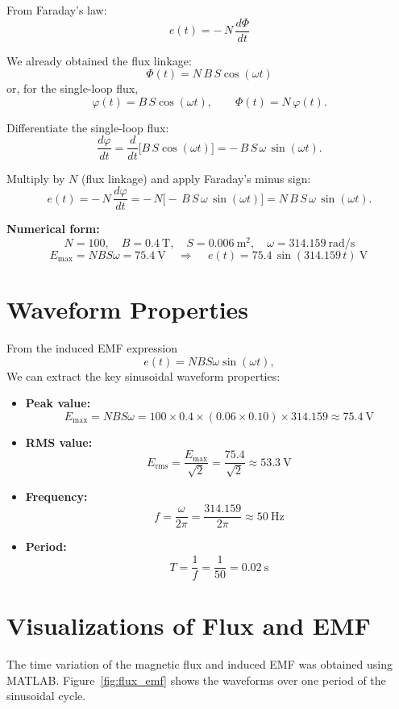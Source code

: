 \documentclass{article}
\begin{document}
From Faraday's law:
\[
e(t) = -\,N\,\frac{d\Phi}{dt}
\]

We already obtained the flux linkage:
\[
\Phi(t) = N\,B\,S\cos(\omega t)
\]
or, for the single-loop flux,
\[
\varphi(t)=B\,S\cos(\omega t),\qquad \Phi(t)=N\,\varphi(t).
\]

Differentiate the single-loop flux:
\[
\frac{d\varphi}{dt} = \frac{d}{dt}\big[B\,S\cos(\omega t)\big]
= -\,B\,S\,\omega\,\sin(\omega t).
\]

Multiply by $N$ (flux linkage) and apply Faraday's minus sign:
\[
e(t) = -\,N\,\frac{d\varphi}{dt}
= -\,N\big[-\,B\,S\,\omega\,\sin(\omega t)\big]
= N\,B\,S\,\omega\,\sin(\omega t).
\]

\noindent\textbf{Numerical form:}
\[
N=100,\quad B=0.4~\text{T},\quad S=0.006~\text{m}^2,\quad \omega=314.159~\text{rad/s}
\]
\[
E_{\max}=NBS\omega = 75.4~\text{V}\quad\Rightarrow\quad
\boxed{\,e(t)=75.4\,\sin(314.159\,t)\ \text{V}\, } 
\]


\section{Waveform Properties} %
From the induced EMF expression
\[
e(t) = NBS\omega \sin(\omega t),
\]
We can extract the key sinusoidal waveform properties:

\begin{itemize}
    \item \textbf{Peak value:}
    \[
    E_{\text{max}} = NBS\omega
    = 100 \times 0.4 \times (0.06 \times 0.10) \times 314.159
    \approx 75.4~\text{V}
    \]

    \item \textbf{RMS value:}
    \[
    E_{\text{rms}} = \frac{E_{\text{max}}}{\sqrt{2}}
    = \frac{75.4}{\sqrt{2}} \approx 53.3~\text{V}
    \]

    \item \textbf{Frequency:}
    \[
    f = \frac{\omega}{2\pi} = \frac{314.159}{2\pi} \approx 50~\text{Hz}
    \]

    \item \textbf{Period:}
    \[
    T = \frac{1}{f} = \frac{1}{50} = 0.02~\text{s}
    \]
\end{itemize}


\section{Visualizations of Flux and EMF} %

The time variation of the magnetic flux and induced EMF was obtained 
using MATLAB. Figure~\ref{fig:flux_emf} shows the waveforms over one 
period of the sinusoidal cycle.
\end{document}
